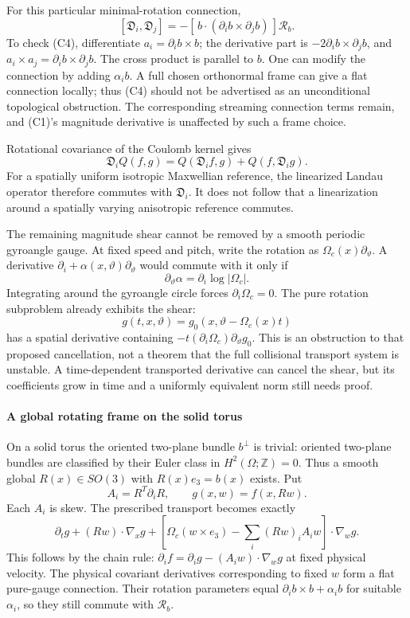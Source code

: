 For this particular minimal-rotation connection, \[
[\mathfrak D_i,\mathfrak D_j]
 =-[\,b\cdot(\partial_i b\times\partial_j b)\,]\mathcal R_b.
\tag{C4}
\] To check (C4), differentiate \(a_i=\partial_i b\times b\); the
derivative part is \(-2\partial_i b\times\partial_j b\), and
\(a_i\times a_j=\partial_i b\times\partial_j b\). The cross product is
parallel to \(b\). One can modify the connection by adding
\(\alpha_i b\). A full chosen orthonormal frame can give a flat
connection locally; thus (C4) should not be advertised as an
unconditional topological obstruction. The corresponding streaming
connection terms remain, and (C1)'s magnitude derivative is unaffected
by such a frame choice.

Rotational covariance of the Coulomb kernel gives \[
\mathfrak D_iQ(f,g)=Q(\mathfrak D_i f,g)+Q(f,\mathfrak D_i g).
\tag{C5}
\] For a spatially uniform isotropic Maxwellian reference, the
linearized Landau operator therefore commutes with \(\mathfrak D_i\). It
does not follow that a linearization around a spatially varying
anisotropic reference commutes.

The remaining magnitude shear cannot be removed by a smooth periodic
gyroangle gauge. At fixed speed and pitch, write the rotation as
\(\Omega_c(x)\partial_\vartheta\). A derivative
\(\partial_i+\alpha(x,\vartheta)\partial_\vartheta\) would commute with
it only if \[
\partial_\vartheta\alpha=\partial_i\log|\Omega_c|.
\] Integrating around the gyroangle circle forces
\(\partial_i\Omega_c=0\). The pure rotation subproblem already exhibits
the shear: \[
g(t,x,\vartheta)=g_0(x,\vartheta-\Omega_c(x)t)
\] has a spatial derivative containing
\(-t(\partial_i\Omega_c)\partial_\vartheta g_0\). This is an obstruction
to that proposed cancellation, not a theorem that the full collisional
transport system is unstable. A time-dependent transported derivative
can cancel the shear, but its coefficients grow in time and a uniformly
equivalent norm still needs proof.

\paragraph{A global rotating frame on the solid
torus}\label{a-global-rotating-frame-on-the-solid-torus}

On a solid torus the oriented two-plane bundle \(b^\perp\) is trivial:
oriented two-plane bundles are classified by their Euler class in
\(H^2(\Omega;\mathbb Z)=0\). Thus a smooth global \(R(x)\in SO(3)\) with
\(R(x)e_3=b(x)\) exists. Put \[
A_i=R^T\partial_iR,\qquad g(x,w)=f(x,Rw).
\] Each \(A_i\) is skew. The prescribed transport becomes exactly \[
\partial_tg+(Rw)\cdot\nabla_xg+
\left[\Omega_c(w\times e_3)
      -\sum_i(Rw)_iA_iw\right]\cdot\nabla_wg.
\tag{C6}
\] This follows by the chain rule:
\(\partial_i f=\partial_i g-(A_iw)\cdot\nabla_wg\) at fixed physical
velocity. The physical covariant derivatives corresponding to fixed
\(w\) form a flat pure-gauge connection. Their rotation parameters equal
\(\partial_i b\times b+\alpha_i b\) for suitable \(\alpha_i\), so they
still commute with \(\mathcal R_b\).

